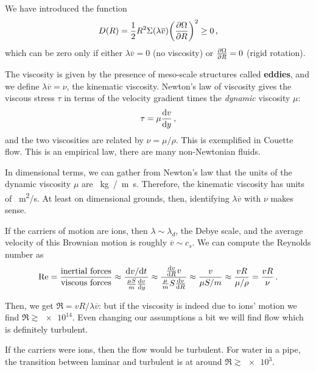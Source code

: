 \documentclass[main.tex]{subfiles}
\begin{document}

We have introduced the function 
%
\begin{align}
D(R) = \frac{1}{2} R^2 \Sigma (\lambda \overline{v})
\qty(\pdv{\Omega }{R})^2 \geq 0
\,,
\end{align}
%
which can be zero only if either \(\lambda \overline{v} = 0\) (no viscosity) or \(\pdv{\Omega }{R} = 0\) (rigid rotation). 

The viscosity is given by the presence of meso-scale structures called \textbf{eddies}, and we define \(\lambda \overline{v} = \nu\), the kinematic viscosity. 
Newton's law of viscosity gives the viscous stress \(\tau \) in terms of the velocity gradient times the \emph{dynamic} viscosity \(\mu \): 
%
\begin{align}
\tau = \mu \dv{v}{y}
\,,
\end{align}
%
and the two viscosities are related by \(\nu = \mu / \rho \). 
This is exemplified in Couette flow. 
This is an empirical law, there are many non-Newtonian fluids.  

In dimensional terms, we can gather from Newton's law that the units of the dynamic viscosity \(\mu \) are \SI{}{kg / m s}. 
Therefore, the kinematic viscosity has units of \SI{}{m^2/s}.
At least on dimensional grounds, then, identifying \(\lambda \overline{v}\) with \(\nu \) makes sense. 

If the carriers of motion are ions, then \(\lambda \sim \lambda _d\), the Debye scale, and the average velocity of this Brownian motion is roughly \(\overline{v} \sim c_s\). 
We can compute the Reynolds number as 
%
\begin{align}
\Re = \frac{\text{inertial  forces}}{\text{viscous forces}}
\approx \frac{\dv*{v}{t}}{ \frac{\mu S}{m} \dv{v}{y}} \approx \frac{\dv{v}{R} v}{\frac{\mu }{m} S \dv{v}{R}} \approx \frac{v}{\mu S / m} \approx \frac{vR}{\mu / \rho } = \frac{vR}{\nu }
\,.
\end{align}

Then, we get \(\Re = v R / \lambda \overline{v}\): but if the viscosity is indeed due to ions' motion we find \(\Re \gtrsim \num{e14}\). 
Even changing our assumptions a bit we will find flow which is definitely turbulent. 

If the carriers were ions, then the flow would be turbulent. 
For water in a pipe, the transition between laminar and turbulent is at around \(\Re \gtrsim \num{e3}\). 
\end{document}
